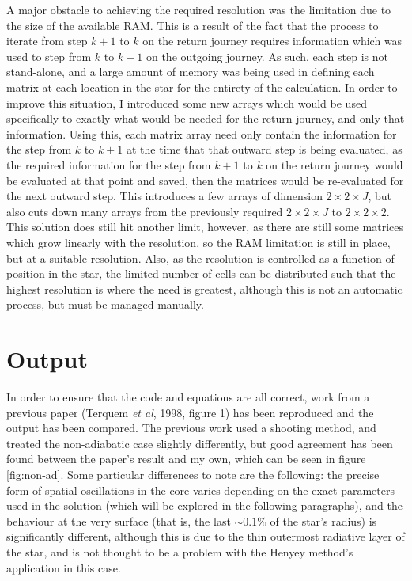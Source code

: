 \documentclass[11pt]{amsart}
\begin{document}
A major obstacle to achieving the required resolution was the limitation due to the size of the available RAM.  This is a result of the fact that the process to iterate from step $k+1$ to $k$ on the return journey requires information which was used to step from $k$ to $k+1$ on the outgoing journey.  As such, each step is not stand-alone, and a large amount of memory was being used in defining each matrix at each location in the star for the entirety of the calculation.  In order to improve this situation, I introduced some new arrays which would be used specifically to exactly what would be needed for the return journey, and only that information.  Using this, each matrix array need only contain the information for the step from $k$ to $k+1$ at the time that that outward step is being evaluated, as the required information for the step from $k+1$ to $k$ on the return journey would be evaluated at that point and saved, then the matrices would be re-evaluated for the next outward step.  This introduces a few arrays of dimension $2 \times 2 \times J$, but also cuts down many arrays from the previously required $2 \times 2 \times J$ to $2 \times 2 \times 2$.  This solution does still hit another limit, however, as there are still some matrices which grow linearly with the resolution, so the RAM limitation is still in place, but at a suitable resolution.  Also, as the resolution is controlled as a function of position in the star, the limited number of cells can be distributed such that the highest resolution is where the need is greatest, although this is not an automatic process, but must be managed manually.







\section{Output}

In order to ensure that the code and equations are all correct, work from a previous paper (Terquem \textit{et al}, 1998, figure 1) has been reproduced and the output has been compared.  The previous work used a shooting method, and treated the non-adiabatic case slightly differently, but good agreement has been found between the paper's result and my own, which can be seen in figure \ref{fig:non-ad}.  Some particular differences to note are the following: the precise form of spatial oscillations in the core varies depending on the exact parameters used in the solution (which will be explored in the following paragraphs), and the behaviour at the very surface (that is, the last $\sim 0.1 \%$ of the star's radius) is significantly different, although this is due to the thin outermost radiative layer of the star, and is not thought to be a problem with the Henyey method's application in this case.
\end{document}
